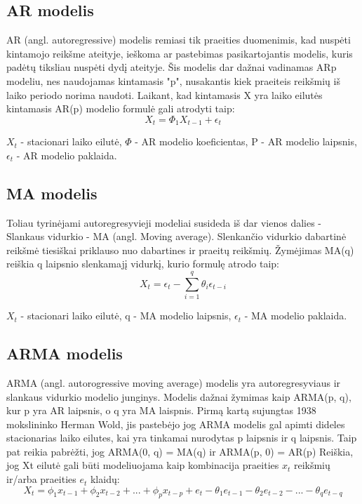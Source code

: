 \documentclass{VUMIFInfKursinis}
\begin{document}
\subsection{AR modelis}
AR (angl. autoregressive) modelis remiasi tik praeities duomenimis, kad nuspėti kintamojo reikšme ateityje, ieškoma ar pastebimas pasikartojantis
modelis, kuris padėtų tiksliau nuspėti dydį ateityje\cite{chi2018stock}. Šis modelis dar dažnai vadinamas ARp modeliu, nes naudojamas kintamasis "p", nusakantis kiek praeiteis reikšmių 
iš laiko periodo norima naudoti. Laikant, kad kintamasis X yra laiko eilutės kintamasis AR(p) modelio formulė gali atrodyti taip: 
\[X_{t} = \Phi _{1}X_{t-1}+\epsilon_{t} \]

${X_t}$ - stacionari laiko eilutė, $\Phi$ - AR modelio koeficientas, P - AR modelio laipsnis, $ \epsilon_{t} $ - AR modelio paklaida.

\subsection {MA modelis}
Toliau tyrinėjami autoregresyvieji modeliai susideda iš dar vienos dalies - Slankaus vidurkio - MA (angl. Moving average). Slenkančio vidurkio dabartinė
reikšmė tiesiškai priklauso nuo dabartines ir praeitų reikšmių. Žymėjimas MA(q) reiškia q laipsnio slenkamajį vidurkį, kurio formulę atrodo taip:  
\[X_{t} = \epsilon_{t} - \sum_{i=1}^{q}\theta_{i}  \epsilon_{t-i}\]

${X_t}$ - stacionari laiko eilutė, q - MA modelio laipsnis, ${\epsilon_t}$ - MA modelio paklaida.

\subsection {ARMA modelis}
ARMA (angl. autorogressive moving average) modelis yra autoregresyviaus ir slankaus vidurkio modelio junginys. Modelis dažnai žymimas
kaip ARMA(p, q), kur p yra AR laipsnis, o q yra MA laispnis. Pirmą kartą sujungtas 1938 mokslininko Herman Wold, jis pastebėjo jog ARMA modelis gal apimti 
dideles stacionarias laiko eilutes, kai yra tinkamai nurodytas p laipsnis ir q laipsnis\cite{makridakis1997arma}. Taip pat reikia pabrėžti, 
jog ARMA(0, q) = MA(q) ir ARMA(p, 0) = AR(p) Reiškia, jog Xt eilutė gali būti modeliuojama kaip kombinacija praeities $x_{t}$ reikšmių ir/arba praeities $e_{t}$ klaidų:
\[X_{t} = \phi_{1}x_{t-1} + \phi_{2}x_{t-2} + ... + \phi_{p}x_{t-p} + e_{t} - \theta_{1}e_{t-1} - \theta_{2}e_{t-2} - ... - \theta_{q}e_{t-q}\]
\end{document}
